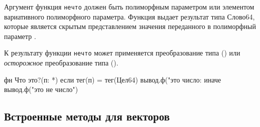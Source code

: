 \bigskip
Аргумент функция \verb+нечто+ должен быть полиморфным параметром или элементом вариативного полиморфного параметра. 
Функция выдает результат типа Слово64, которые является скрытым представлением значения переданного в полиморфный параметр .

К результату функции \verb+нечто+ может применяется преобразование типа () или \emph{осторожное} преобразование типа ().

\begin{Trivil}
фн Что это?(п: *) {
    если тег(п) = тег(Цел64) { 
        вывод.ф("это число: %
    }
    иначе { 
        вывод.ф("это не число") 
    }
}
\end{Trivil}

\hypertarget{stdvector}{%
\subsection{Встроенные методы для векторов}\label{stdfuncs:stdvector}}

